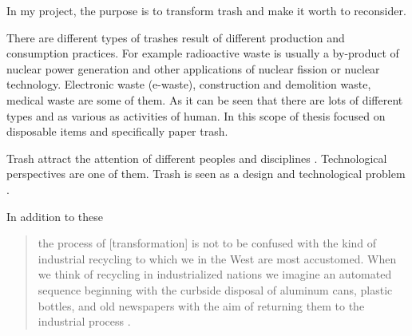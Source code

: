

In my project, the purpose is to transform trash and make it worth to reconsider. 





%
%
There are different types of trashes result of different production and consumption practices. For example radioactive waste is usually a by-product of nuclear power generation and other applications of nuclear fission or nuclear technology. Electronic waste (e-waste), construction and demolition waste, medical waste are some of them. As it can be seen that there are lots of different types and as various as activities of human. In this scope of thesis focused on disposable items and specifically paper trash.





%
%
Trash attract the attention of different peoples and disciplines  \citep{emgin2012trashion}. Technological perspectives are one of them. Trash is seen as a design and technological problem \citep{mcdonough2010cradle}.  


In addition to these
\begin{quote}
the process of [transformation] is not to be confused with the kind of industrial recycling to which we in the West are most accustomed. When we think of recycling in industrialized nations we imagine an automated sequence beginning with the curbside disposal of aluminum cans, plastic bottles, and old newspapers with the aim of returning them to the industrial process \citep{cerny1996recycled}. 
\end{quote}

